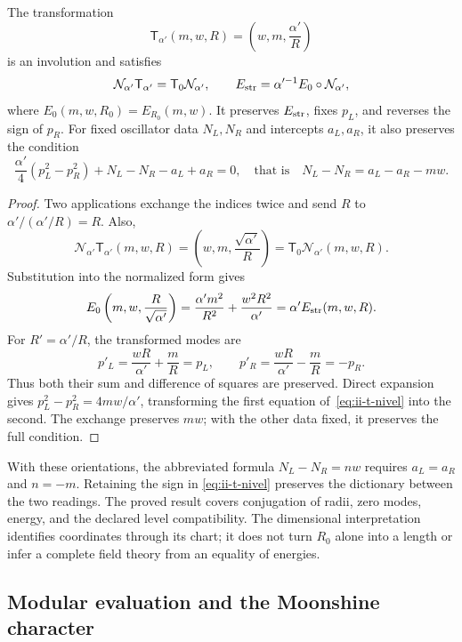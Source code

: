 \begin{theorem}
\label{thm:ii-t-cuerda}
The transformation
\[
 \mathsf T_{\alpha'}(m,w,R)=\left(w,m,\frac{\alpha'}R\right)
\]
is an involution and satisfies
\begin{equation}
 \mathcal N_{\alpha'}\mathsf T_{\alpha'}
 =\mathsf T_0\mathcal N_{\alpha'},\qquad
 E_{\rm str}=\alpha'^{-1}E_0\circ\mathcal N_{\alpha'},
 \label{eq:ii-t-normalizacion}
\end{equation}
where \(E_0(m,w,R_0)=E_{R_0}(m,w)\). It preserves \(E_{\rm str}\),
fixes \(p_L\), and reverses the sign of \(p_R\). For fixed
oscillator data \(N_L,N_R\) and intercepts \(a_L,a_R\),
it also preserves the condition
\begin{equation}
 \frac{\alpha'}4(p_L^2-p_R^2)+N_L-N_R-a_L+a_R=0,
 \quad\text{that is}\quad
 N_L-N_R=a_L-a_R-mw.
 \label{eq:ii-t-nivel}
\end{equation}
\end{theorem}

\begin{proof}
Two applications exchange the indices twice and send
\(R\) to \(\alpha'/(\alpha'/R)=R\). Also,
\[
 \mathcal N_{\alpha'}\mathsf T_{\alpha'}(m,w,R)
 =\left(w,m,\frac{\sqrt{\alpha'}}R\right)
 =\mathsf T_0\mathcal N_{\alpha'}(m,w,R).
\]
Substitution into the normalized form gives
\[
 E_0\left(m,w,\frac R{\sqrt{\alpha'}}\right)
 =\frac{\alpha'm^2}{R^2}+\frac{w^2R^2}{\alpha'}
 =\alpha'E_{\rm str}(m,w,R).
\]
For \(R'=\alpha'/R\), the transformed modes are
\[
 p'_L=\frac{wR}{\alpha'}+\frac mR=p_L,\qquad
 p'_R=\frac{wR}{\alpha'}-\frac mR=-p_R.
\]
Thus both their sum and difference of squares are preserved.
Direct expansion gives \(p_L^2-p_R^2=4mw/\alpha'\), transforming
the first equation of~\eqref{eq:ii-t-nivel} into the second.
The exchange preserves \(mw\); with the other data fixed, it preserves
the full condition.
\end{proof}

With these orientations, the abbreviated formula \(N_L-N_R=nw\) requires
\(a_L=a_R\) and \(n=-m\). Retaining the sign in
\eqref{eq:ii-t-nivel} preserves the dictionary between the two readings.
The proved result covers conjugation of radii, zero modes,
energy, and the declared level compatibility. The dimensional interpretation
identifies coordinates through its chart; it does not turn
\(R_0\) alone into a length or infer a complete field theory
from an equality of energies.

\subsection{Modular evaluation and the Moonshine character}

